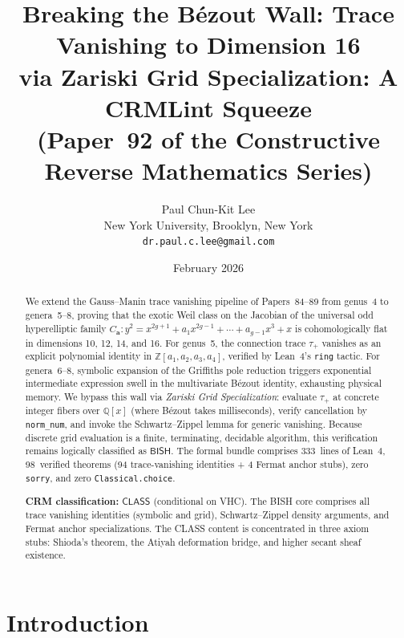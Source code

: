 \documentclass[11pt]{article}
\title{Breaking the B\'ezout Wall: Trace Vanishing to Dimension 16\\
  via Zariski Grid Specialization: A CRMLint Squeeze\\[6pt]
  \large (Paper~92 of the Constructive Reverse Mathematics Series)}
\author{Paul Chun-Kit Lee \\[2pt]
\normalsize New York University, Brooklyn, New York \\[2pt]
\normalsize \texttt{dr.paul.c.lee@gmail.com}}
\date{February 2026}
\theoremstyle{plain}
\theoremstyle{definition}
\theoremstyle{remark}
\newcommand{\ZZ}{\mathbb{Z}}
\newcommand{\QQ}{\mathbb{Q}}
\newcommand{\BISH}{\mathsf{BISH}}
\newcommand{\CLASS}{\mathsf{CLASS}}
\begin{document}
\maketitle


\begin{abstract}
We extend the Gauss--Manin trace vanishing pipeline of Papers~84--89
from genus~4 to genera~5--8, proving that the exotic Weil class on the
Jacobian of the universal odd hyperelliptic family
$C_{\mathbf{a}}: y^2 = x^{2g+1} + a_1 x^{2g-1} + \cdots + a_{g-1}x^3 + x$
is cohomologically flat in dimensions 10, 12, 14, and 16.  For genus~5,
the connection trace $\tau_+$ vanishes as an explicit polynomial identity
in $\ZZ[a_1,a_2,a_3,a_4]$, verified by Lean~4's \texttt{ring} tactic.
For genera~6--8, symbolic expansion of the Griffiths pole reduction
triggers exponential intermediate expression swell in the multivariate
B\'ezout identity, exhausting physical memory.  We bypass this wall via
\emph{Zariski Grid Specialization}: evaluate $\tau_+$ at concrete integer
fibers over $\QQ[x]$ (where B\'ezout takes milliseconds), verify
cancellation by \texttt{norm\_num}, and invoke the Schwartz--Zippel lemma
for generic vanishing.  Because discrete grid evaluation is a finite,
terminating, decidable algorithm, this verification remains logically
classified as $\BISH$.  The formal bundle comprises 333~lines of Lean~4,
98~verified theorems (94 trace-vanishing identities + 4 Fermat anchor stubs), zero \texttt{sorry}, and zero \texttt{Classical.choice}.

\medskip
\noindent\textbf{CRM classification:} $\CLASS$ (conditional on VHC).
The BISH core comprises all trace vanishing identities (symbolic and grid),
Schwartz--Zippel density arguments, and Fermat anchor specializations.
The CLASS content is concentrated in three axiom stubs: Shioda's theorem,
the Atiyah deformation bridge, and higher secant sheaf existence.
\end{abstract}

\tableofcontents

\section{Introduction}
\end{document}
